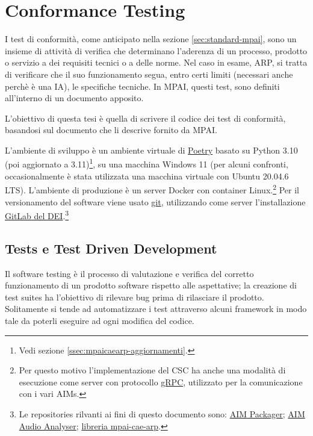 
\chapter{Conformance Testing} \label{chp:conformancetesting}    %
I test di conformità, come anticipato nella sezione \ref{sec:standard-mpai}, sono un insieme di attività di verifica che determinano l'aderenza di un processo, prodotto o servizio a dei requisiti tecnici o a delle norme.
Nel caso in esame, \ac{ARP}, si tratta di verificare che il suo funzionamento segua, entro certi limiti (necessari anche perchè è una \acs{IA}), le specifiche tecniche. In \ac{MPAI}, questi test, sono definiti all'interno di un documento apposito.

L'obiettivo di questa tesi è quella di scrivere il codice dei test di conformità, basandosi sul documento che li descrive fornito da MPAI.

L'ambiente di sviluppo è un ambiente virtuale di \href{https://python-poetry.org/}{Poetry} basato su Python 3.10 (poi aggiornato a 3.11)\footnote{Vedi sezione \ref{ssec:mpaicaearp-aggiornamenti}.}, su una macchina Windows 11 (per alcuni confronti, occasionalmente è stata utilizzata una macchina virtuale con Ubuntu 20.04.6 LTS). L'ambiente di produzione è un server Docker con container Linux.\footnote{Per questo motivo l'implementazione del \ac{CSC} ha anche una modalità di esecuzione come server con protocollo \href{https://grpc.io/}{gRPC}, utilizzato per la comunicazione con i vari \acp{AIM}.} Per il versionamento del software viene usato \href{https://git-scm.com/}{git}, utilizzando come server l'installazione \href{https://gitlab.dei.unipd.it/}{GitLab del \ac{DEI}}.\footnote{Le repositories rilvanti ai fini di questo documento sono: \href{https://gitlab.dei.unipd.it/mpai/packager}{\ac{AIM} Packager}; \href{https://gitlab.dei.unipd.it/mpai/audio-analyzer}{\ac{AIM} Audio Analyser}; \href{https://gitlab.dei.unipd.it/mpai/mpai-cae-arp}{libreria mpai-cae-arp}.}


\section{Tests e Test Driven Development} \label{sec:tests-tdd}
Il software testing è il processo di valutazione e verifica del corretto funzionamento di un prodotto software rispetto alle aspettative; la creazione di test suites ha l'obiettivo di rilevare bug prima di rilasciare il prodotto.
Solitamente si tende ad automatizzare i test attraverso alcuni framework in modo tale da poterli eseguire ad ogni modifica del codice.

